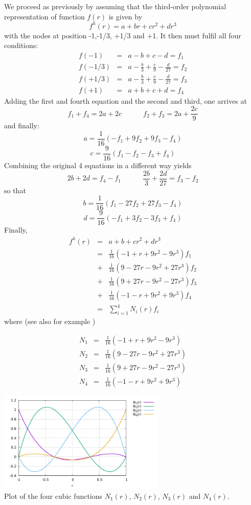 We proceed as previously by assuming that the third-order 
polynomial representation of function $f(r)$ is given by
\[
f^h(r)=a+br+cr^2+dr^3
\]
with the nodes at position -1,-1/3, +1/3 and +1.
It then must fulfil all four conditions:
\begin{eqnarray}
f(-1)   &=& a-b+c-d = f_1 \nonumber\\
f(-1/3) &=& a-\frac{b}{3}+\frac{c}{9}-\frac{d}{27} = f_2 \nonumber\\
f(+1/3) &=& a-\frac{b}{3}+\frac{c}{9}-\frac{d}{27} = f_3 \nonumber\\
f(+1)   &=& a+b+c+d = f_4 \nonumber
\end{eqnarray}
Adding the first and fourth equation and the second and third, one arrives at
\[
f_1+f_4 = 2a+2c \quad\quad\quad f_2+f_3=2a+\frac{2c}{9}
\]
and finally:
\[
a=\frac{1}{16} \left( -f_1 + 9f_2 + 9f_3 - f_4  \right)
\]
\[
c=\frac{9}{16}\left(f_1-f_2-f_3+f_4\right)
\]
Combining the original 4 equations in a different way yields
\[
2b+2d=f_4-f_1 
\quad\quad\quad
\frac{2b}{3} + \frac{2d}{27} = f_3-f_2
\]
so that
\[
b=\frac{1}{16} \left( f_1 - 27f_2 + 27f_3 -f_4   \right)
\]
\[
d=\frac{9}{16} \left( -f_1 + 3f_2 - 3f_3 + f_4 \right)
\]
Finally,
\begin{eqnarray}
f^h(r) 
&=& a+b+cr^2+dr^3 \nonumber\\
&=& \frac{1}{16} (-1+  r +9r^2 - 9r^3 )f_1 \nonumber\\ 
&+& \frac{1}{16} ( 9-27r -9r^2 +27r^3 )f_2 \nonumber\\ 
&+& \frac{1}{16} ( 9+27r -9r^2 -27r^3 )f_3 \nonumber\\ 
&+& \frac{1}{16} (-1-  r +9r^2 + 9r^3 )f_4 \nonumber\\ 
&=& \sum_{i=1}^4 N_i(r) f_i \nonumber
\end{eqnarray}
where (see also for example \cite[p49]{li06})
\begin{mdframed}[backgroundcolor=blue!5]
\begin{eqnarray}
N_1&=& \frac{1}{16} (-1+  r+9r^2- 9r^3 ) \nonumber\\ 
N_2&=& \frac{1}{16} ( 9-27r-9r^2+27r^3 ) \nonumber\\ 
N_3&=& \frac{1}{16} ( 9+27r-9r^2-27r^3 ) \nonumber\\ 
N_4&=& \frac{1}{16} (-1-  r+9r^2+ 9r^3 ) \nonumber
\end{eqnarray}
\end{mdframed}

\begin{center}
\includegraphics[width=8cm]{images/basis1D/cubic.pdf}\\
{\captionfont Plot of the four cubic functions $N_1(r)$, $N_2(r)$, $N_3(r)$ and $N_4(r)$.}
\end{center}

